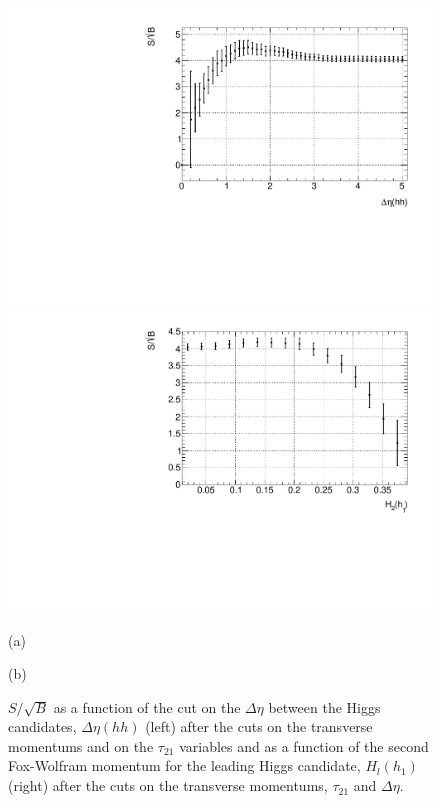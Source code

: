 \begin{figure}
	\centering
	\begin{minipage}{.5\textwidth}
		\centering
		\includegraphics[trim={.6cm 0 0 0},clip,width=\linewidth]{./Figures/SSB_hh_deltaEta.pdf}
	\end{minipage}%
	\begin{minipage}{.5\textwidth}
		\centering
		\includegraphics[trim={0 0 .6cm 0},clip,width=\linewidth]{./Figures/SSB_h1_FW2.pdf}
	\end{minipage}
	\begin{minipage}[t]{0.5\textwidth}
		\caption*{(a)}
	\end{minipage}%
	\hfill
	\begin{minipage}[t]{0.5\textwidth}
		\caption*{(b)}
	\end{minipage}
	\caption{$S/\sqrt{B}$ as a function of the cut on the $\Delta\eta$ between the Higgs candidates, $\Delta\eta(hh)$ (left) after the cuts on the transverse momentums and on the $\tau_{21}$ variables and as a function of the second Fox-Wolfram momentum for the leading Higgs candidate, $H_l(h_1)$ (right) after the cuts on the transverse momentums, $\tau_{21}$ and $\Delta\eta$.}
	\label{fig:SSB_hh_deltaEta}
\end{figure} 

